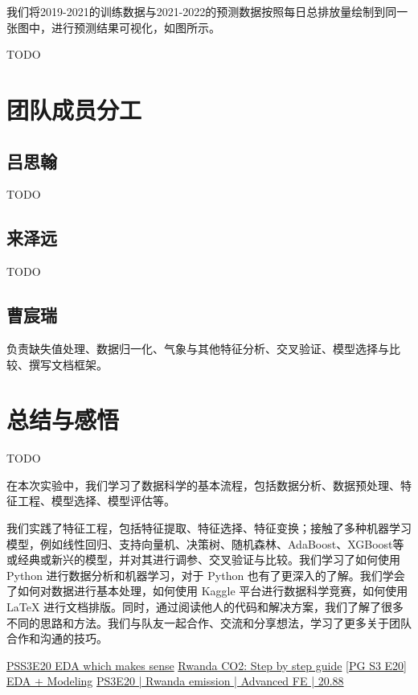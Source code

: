 \documentclass{ctexart}
\begin{document}
我们将2019-2021的训练数据与2021-2022的预测数据按照每日总排放量绘制到同一张图中，进行预测结果可视化，如图所示。

TODO

\section{团队成员分工}

\subsection{吕思翰}

TODO

\subsection{来泽远}

TODO

\subsection{曹宸瑞}

负责缺失值处理、数据归一化、气象与其他特征分析、交叉验证、模型选择与比较、撰写文档框架。

\section{总结与感悟}

TODO

在本次实验中，我们学习了数据科学的基本流程，包括数据分析、数据预处理、特征工程、模型选择、模型评估等。

我们实践了特征工程，包括特征提取、特征选择、特征变换；接触了多种机器学习模型，例如线性回归、支持向量机、决策树、随机森林、AdaBoost、XGBoost等或经典或新兴的模型，并对其进行调参、交叉验证与比较。我们学习了如何使用 Python 进行数据分析和机器学习，对于 Python 也有了更深入的了解。我们学会了如何对数据进行基本处理，如何使用 Kaggle 平台进行数据科学竞赛，如何使用 \LaTeX{} 进行文档排版。同时，通过阅读他人的代码和解决方案，我们了解了很多不同的思路和方法。我们与队友一起合作、交流和分享想法，学习了更多关于团队合作和沟通的技巧。

\begin{thebibliography}{100}
\href{https://www.kaggle.com/code/ambrosm/pss3e20-eda-which-makes-sense}{PSS3E20 EDA which makes sense}
\href{https://www.kaggle.com/code/kacperrabczewski/rwanda-co2-step-by-step-guide}{Rwanda CO2: Step by step guide}
\href{https://www.kaggle.com/code/yaaangzhou/pg-s3-e20-eda-modeling}{[PG S3 E20] EDA + Modeling}
\href{https://www.kaggle.com/code/dmitryuarov/ps3e20-rwanda-emission-advanced-fe-20-88}{PS3E20 | Rwanda emission | Advanced FE | 20.88}
\end{thebibliography}
\end{document}

